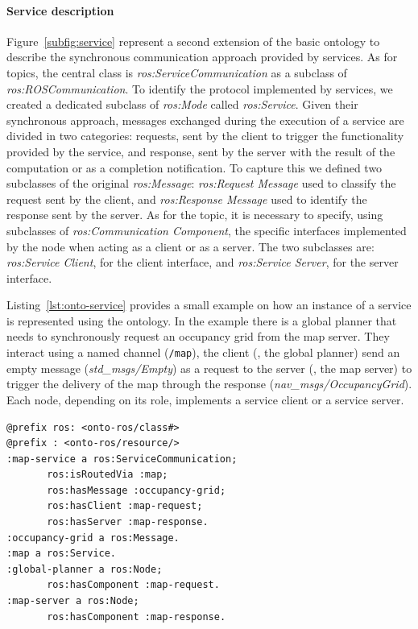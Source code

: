 \paragraph{Service description} Figure~\ref{subfig:service} represent a second extension of the basic ontology to describe the synchronous communication approach provided by services.  As for topics, the central class is \textit{ros:Service\-Com\-mu\-ni\-ca\-tion} as a subclass of \textit{ros:ROS\-Com\-mu\-ni\-ca\-tion}. To identify the protocol implemented by services, we created a dedicated subclass of \textit{ros:Mode} called \textit{ros:Service}. Given their
synchronous approach, messages exchanged during the execution of a service are divided in two categories: requests, sent by the client to trigger the functionality provided by the service, and response, sent by the server with the result of the computation or as a completion notification. To capture this we defined two subclasses of the original \textit{ros:Message}: \textit{ros:Request Message} used to classify the request sent by the client, and \textit{ros:Response Message} used to identify the response sent by the server. As for the topic, it is necessary to specify, using subclasses of \textit{ros:Communication Component}, the specific interfaces implemented by the node when acting as a client or as a server. The two subclasses are: \textit{ros:Service Client}, for the client interface, and \textit{ros:Service Server}, for the server interface.

Listing~\ref{lst:onto-service} provides a small example on how an instance of a service is represented using the ontology. In the example there is a global planner that needs to synchronously request an occupancy grid from the map server. They interact using a named channel (\texttt{/map}), the client (\ie, the global planner) send an empty message (\textit{std\_msgs/Empty}) as a request to the server (\ie, the map server) to trigger the delivery of the map through the response (\textit{nav\_msgs/OccupancyGrid}). Each node, depending on its role, implements a service client or a service server.

\begin{lstlisting}[frame=tb,caption={TODO},label=lst:onto-service]
@prefix ros: <onto-ros/class#>
@prefix : <onto-ros/resource/>
:map-service a ros:ServiceCommunication;
       ros:isRoutedVia :map;
       ros:hasMessage :occupancy-grid;
       ros:hasClient :map-request;
       ros:hasServer :map-response.
:occupancy-grid a ros:Message.
:map a ros:Service.  
:global-planner a ros:Node;
       ros:hasComponent :map-request.
:map-server a ros:Node;
       ros:hasComponent :map-response.
 \end{lstlisting}




